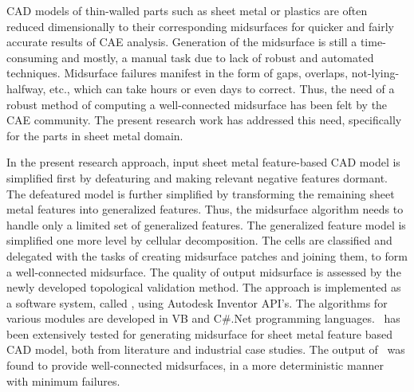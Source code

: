 

CAD models of thin-walled parts such as sheet metal or plastics are often reduced dimensionally to their corresponding midsurfaces for quicker and fairly accurate results of CAE analysis. Generation of the midsurface is still a time-consuming and mostly, a manual task due to lack of robust and automated techniques.  Midsurface failures manifest in the form of gaps, overlaps, not-lying-halfway, etc., which can take hours or even days to correct. Thus, the need of a robust method of computing a well-connected midsurface has been felt by the CAE community. The present research work has addressed this need, specifically for the parts in sheet metal domain.

In the present research approach, input sheet metal feature-based CAD model is simplified first by defeaturing and making relevant negative features dormant. The defeatured model is further simplified by transforming the remaining sheet metal features into generalized features. Thus, the midsurface algorithm needs to handle only a limited set of generalized features. The generalized feature model is simplified one more level by cellular decomposition. The cells are classified and delegated with the tasks of creating midsurface patches and joining them, to form a well-connected midsurface. The quality of output midsurface is assessed by the newly developed topological validation method. The approach is implemented as a software system, called \mysystemname, using Autodesk Inventor API's. The algorithms for various modules are developed in VB and C\#.Net programming languages. \mysystemname~has been extensively tested for generating midsurface for sheet metal feature based CAD model, both from literature and industrial case studies. The output of \mysystemname~was found to provide well-connected midsurfaces, in a more deterministic manner with minimum failures.


